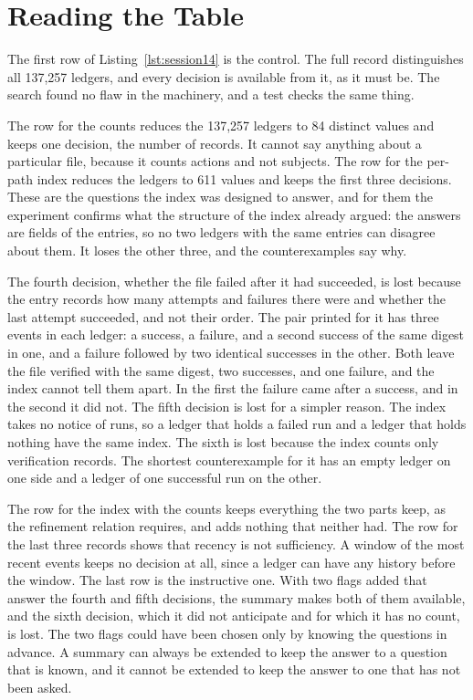 

\section{Reading the Table}

The first row of Listing~\ref{lst:session14} is the control. The full record distinguishes all 137,257 ledgers, and every decision is available from it, as it must be. The search found no flaw in the machinery, and a test checks the same thing.

The row for the counts reduces the 137,257 ledgers to 84 distinct values and keeps one decision, the number of records. It cannot say anything about a particular file, because it counts actions and not subjects. The row for the per-path index reduces the ledgers to 611 values and keeps the first three decisions. These are the questions the index was designed to answer, and for them the experiment confirms what the structure of the index already argued: the answers are fields of the entries, so no two ledgers with the same entries can disagree about them. It loses the other three, and the counterexamples say why.

The fourth decision, whether the file failed after it had succeeded, is lost because the entry records how many attempts and failures there were and whether the last attempt succeeded, and not their order. The pair printed for it has three events in each ledger: a success, a failure, and a second success of the same digest in one, and a failure followed by two identical successes in the other. Both leave the file verified with the same digest, two successes, and one failure, and the index cannot tell them apart. In the first the failure came after a success, and in the second it did not. The fifth decision is lost for a simpler reason. The index takes no notice of runs, so a ledger that holds a failed run and a ledger that holds nothing have the same index. The sixth is lost because the index counts only verification records. The shortest counterexample for it has an empty ledger on one side and a ledger of one successful run on the other.

The row for the index with the counts keeps everything the two parts keep, as the refinement relation requires, and adds nothing that neither had. The row for the last three records shows that recency is not sufficiency. A window of the most recent events keeps no decision at all, since a ledger can have any history before the window. The last row is the instructive one. With two flags added that answer the fourth and fifth decisions, the summary makes both of them available, and the sixth decision, which it did not anticipate and for which it has no count, is lost. The two flags could have been chosen only by knowing the questions in advance. A summary can always be extended to keep the answer to a question that is known, and it cannot be extended to keep the answer to one that has not been asked.

